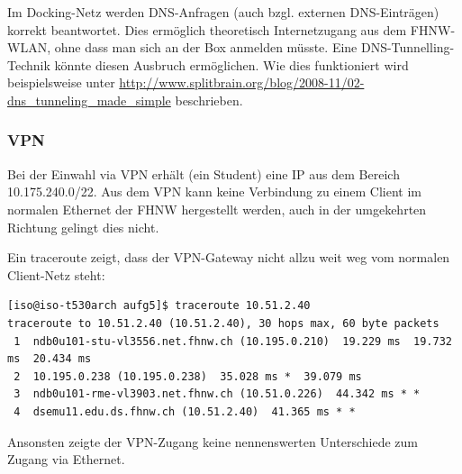 \documentclass[a4paper,11pt]{scrartcl}
\begin{document}
Im Docking-Netz werden DNS-Anfragen (auch bzgl. externen DNS-Einträgen) korrekt beantwortet. Dies ermöglich theoretisch Internetzugang aus dem FHNW-WLAN, ohne dass man sich an der Box anmelden müsste. Eine DNS-Tunnelling-Technik könnte diesen Ausbruch ermöglichen. Wie dies funktioniert wird beispielsweise unter \url{http://www.splitbrain.org/blog/2008-11/02-dns_tunneling_made_simple} beschrieben.

\subsubsection{VPN}
Bei der Einwahl via VPN erhält (ein Student) eine IP aus dem Bereich 10.175.240.0/22. Aus dem VPN kann keine Verbindung zu einem Client im normalen Ethernet der FHNW hergestellt werden, auch in der umgekehrten Richtung gelingt dies nicht.

Ein traceroute zeigt, dass der VPN-Gateway nicht allzu weit weg vom normalen Client-Netz steht:
\begin{lstlisting}
[iso@iso-t530arch aufg5]$ traceroute 10.51.2.40
traceroute to 10.51.2.40 (10.51.2.40), 30 hops max, 60 byte packets
 1  ndb0u101-stu-vl3556.net.fhnw.ch (10.195.0.210)  19.229 ms  19.732 ms  20.434 ms
 2  10.195.0.238 (10.195.0.238)  35.028 ms *  39.079 ms
 3  ndb0u101-rme-vl3903.net.fhnw.ch (10.51.0.226)  44.342 ms * *
 4  dsemu11.edu.ds.fhnw.ch (10.51.2.40)  41.365 ms * *
\end{lstlisting}
Ansonsten zeigte der VPN-Zugang keine nennenswerten Unterschiede zum Zugang via Ethernet.
\end{document}
